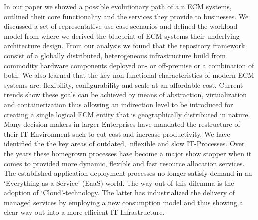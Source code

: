 
\begin{zusammenfassung}        %
 In our paper we showed a possible evolutionary path  of a n ECM systems, outlined their core functionality and the services they provide to businesses. We discussed a set of representative use case scenarios and defined the workload model from where we derived the blueprint of ECM systems their underlying architecture design. From our analysis we found that the repository framework consist of a globally distributed, heterogeneous infrastructure build from commodity hardware components deployed on- or off-premise or a combination of both. We also learned that the key non-functional characteristics of modern ECM systems are: flexibility, configurability and scale at an affordable cost. Current trends show these goals can be achieved by means of abstraction, virtualization and containerization thus allowing an indirection level to be introduced for creating a single logical ECM entity that is geographically distributed in nature.
 Many decision makers in larger Enterprises have mandated the restructure of their IT-Environment such to cut cost and increase productivity. We have identified the the key areas of outdated, inflexible and slow IT-Processes. Over the years these homegrown processes have become a major show stopper when it comes to provided more dynamic, flexible and fast resource allocation services. The established application deployment processes no longer satisfy demand in an ‘Everything as a Service’ (EaaS) world. The way out of this dilemma is the adoption of ‘Cloud’-technology. The latter has industrialized the delivery of managed services by employing a new consumption model and thus showing a clear way out into a more efficient IT-Infrastructure. 
\end{zusammenfassung}
\ifCLASSINFOlangDE
{}
\else
{}
\fi
